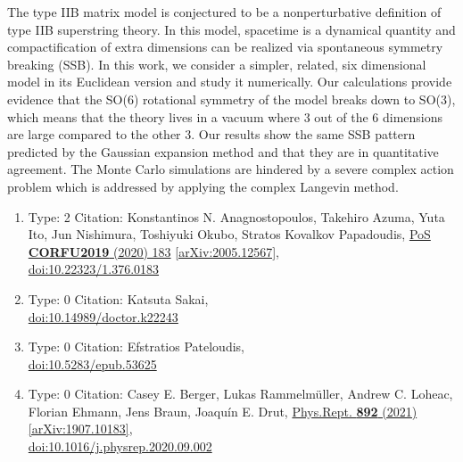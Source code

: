 \documentclass[a4paper,10pt]{article}
\begin{document}
\begin{enumerate}
The type IIB matrix model is conjectured to be a nonperturbative definition of type IIB superstring theory. In this model, spacetime is a dynamical quantity and compactification of extra dimensions can be realized via spontaneous symmetry breaking (SSB). In this work, we consider a simpler, related, six dimensional model in its Euclidean version and study it numerically. Our calculations provide evidence that the SO(6) rotational symmetry of the model breaks down to SO(3), which means that the theory lives in a vacuum where 3 out of the 6 dimensions are large compared to the other 3. Our results show the same SSB pattern predicted by the Gaussian expansion method and that they are in quantitative agreement. The Monte Carlo simulations are hindered by a severe complex action problem which is addressed by applying the complex Langevin method.
\begin{enumerate}
  \item Type: 2 Citation: Konstantinos N. Anagnostopoulos, Takehiro Azuma, Yuta Ito, Jun Nishimura, Toshiyuki Okubo, Stratos Kovalkov Papadoudis, \href{https://www.doi.org/10.22323/1.376.0183}{PoS {\bf CORFU2019} (2020) 183}  \href{https://arxiv.org/abs/2005.12567}{[arXiv:2005.12567]},\\\href{https://www.doi.org/10.22323/1.376.0183}{doi:10.22323/1.376.0183}
  \item Type: 0 Citation: Katsuta Sakai,\\\href{https://www.doi.org/10.14989/doctor.k22243}{doi:10.14989/doctor.k22243}
  \item Type: 0 Citation: Efstratios Pateloudis,\\\href{https://www.doi.org/10.5283/epub.53625}{doi:10.5283/epub.53625}
  \item Type: 0 Citation: Casey E. Berger, Lukas Rammelmüller, Andrew C. Loheac, Florian Ehmann, Jens Braun, Joaquín E. Drut, \href{https://www.doi.org/10.1016/j.physrep.2020.09.002}{Phys.Rept. {\bf 892} (2021) }  \href{https://arxiv.org/abs/1907.10183}{[arXiv:1907.10183]},\\\href{https://www.doi.org/10.1016/j.physrep.2020.09.002}{doi:10.1016/j.physrep.2020.09.002}

\end{enumerate}
\end{enumerate}
\end{document}
